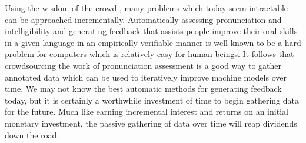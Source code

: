Using the wisdom of the crowd \cite{surowiecki2005wisdom}, many problems which today seem intractable can be approached incrementally. Automatically assessing pronunciation and intelligibility and generating feedback that assists people improve their oral skills in a given language in an empirically verifiable manner is well known to be a hard problem for computers which is relatively easy for human beings. It follows that crowdsourcing the work of pronunciation assessment is a good way to gather annotated data which can be used to iteratively improve machine models over time. We may not know the best automatic methods for generating feedback today, but it is certainly a worthwhile investment of time to begin gathering data for the future. Much like earning incremental interest and returns on an initial monetary investment, the passive gathering of data over time will reap dividends down the road.




